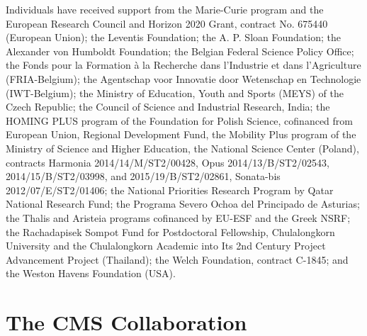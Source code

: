 \documentclass[11pt,twoside,a4paper,cmspaper,final,collab]{cms-tdr}
\begin{document}
\begin{acknowledgments}
 Individuals have received support from the Marie-Curie program and the European Research Council and Horizon 2020 Grant, contract No. 675440 (European Union); the Leventis Foundation; the A. P. Sloan Foundation; the Alexander von Humboldt Foundation; the Belgian Federal Science Policy Office; the Fonds pour la Formation \`a la Recherche dans l'Industrie et dans l'Agriculture (FRIA-Belgium); the Agentschap voor Innovatie door Wetenschap en Technologie (IWT-Belgium); the Ministry of Education, Youth and Sports (MEYS) of the Czech Republic; the Council of Science and Industrial Research, India; the HOMING PLUS program of the Foundation for Polish Science, cofinanced from European Union, Regional Development Fund, the Mobility Plus program of the Ministry of Science and Higher Education, the National Science Center (Poland), contracts Harmonia 2014/14/M/ST2/00428, Opus 2014/13/B/ST2/02543, 2014/15/B/ST2/03998, and 2015/19/B/ST2/02861, Sonata-bis 2012/07/E/ST2/01406; the National Priorities Research Program by Qatar National Research Fund; the Programa Severo Ochoa del Principado de Asturias; the Thalis and Aristeia programs cofinanced by EU-ESF and the Greek NSRF; the Rachadapisek Sompot Fund for Postdoctoral Fellowship, Chulalongkorn University and the Chulalongkorn Academic into Its 2nd Century Project Advancement Project (Thailand); the Welch Foundation, contract C-1845; and the Weston Havens Foundation (USA).
\end{acknowledgments}




\cleardoublepage \appendix\section{The CMS Collaboration \label{app:collab}}\begin{sloppypar}\end{sloppypar}
\end{document}
